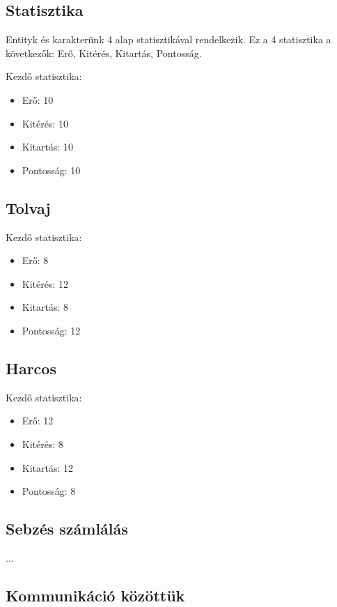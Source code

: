 \subsection{Statisztika}

Entityk és karakterünk 4 alap statisztikával rendelkezik.
Ez a 4 statisztika a következők: Erő, Kitérés, Kitartás, Pontosság.

\noindent Kezdő statisztika:
\begin{itemize}
    \item Erő: 10
    \item Kitérés: 10
    \item Kitartás: 10
    \item Pontosság: 10
\end{itemize}


\subsection{Tolvaj}

\noindent Kezdő statisztika:
\begin{itemize}
    \item Erő: 8
    \item Kitérés: 12
    \item Kitartás: 8
    \item Pontosság: 12
\end{itemize}

\subsection{Harcos}

\noindent Kezdő statisztika:
\begin{itemize}
    \item Erő: 12
    \item Kitérés: 8
    \item Kitartás: 12
    \item Pontosság: 8
\end{itemize}

\subsection{Sebzés számlálás}

...

\subsection{Kommunikáció közöttük}

